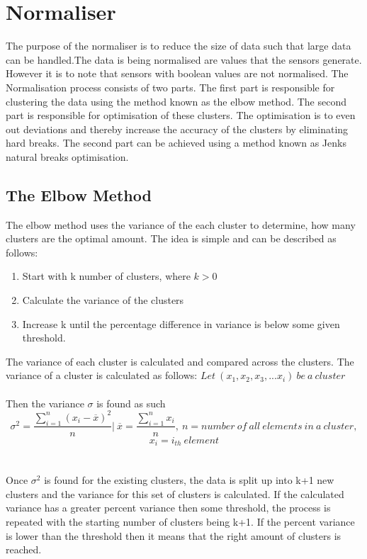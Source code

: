 \section{Normaliser}
\label{sec:normaliser}
The purpose of the normaliser is to reduce the size of data such that large data can be handled.The data is being normalised are values that the sensors generate. However it is to note that sensors with boolean values are not normalised. The Normalisation process consists of two parts. The first part is responsible for clustering the data using the method known as the elbow method. The second part is responsible for optimisation of these clusters. The optimisation is to even out deviations and thereby increase the accuracy of the clusters by eliminating hard breaks. The second part can be achieved using a method known as Jenks natural breaks optimisation.

\subsection{The Elbow Method}
\label{sub:elbow_method}
The elbow method uses the variance of the each cluster to determine, how many clusters are the optimal amount. The idea is simple and can be described as follows:
\begin{enumerate}
\item Start with k number of clusters, where $k>0$
\item Calculate the variance of the clusters
\item Increase k until the percentage difference in variance is below some given threshold.
\end{enumerate}
The variance of each cluster is calculated and compared across the clusters. The variance of a cluster is calculated as follows:
$Let\ (x_1,x_2,x_3,...x_i) \ be \ a\ cluster $
\\\\Then the variance $\sigma$ is found as such
$$\sigma^2 = \frac{\displaystyle\sum_{i = 1}^{n}(x_{i}-\overline{x})^2 }{n} \Biggr\rvert\ \overline{x}  =\frac{\displaystyle\sum_{i=1}^{n}x_{i}}{n},\ n =number\ of\ all\ elements\ in\ a\ cluster ,$$ 
$$ x_{i} = i_{th}\ element $$
\\\\
Once $\sigma^2$ is found for the existing clusters, the data is split up into k+1 new clusters and the variance for this set of clusters is calculated. If the calculated variance has a greater percent variance then some threshold, the process is repeated with the starting number of clusters being k+1. If the percent variance is lower than the threshold then it means that the right amount of clusters is reached.
